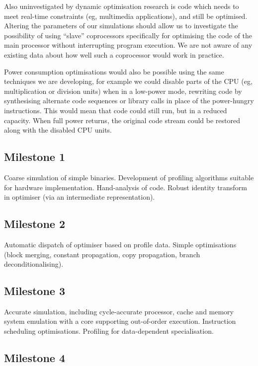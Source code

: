 \documentclass[11pt,letterpaper,onecolumn,notitlepage]{article}
\begin{document}
Also uninvestigated by dynamic optimisation research is code which needs to meet real-time constraints (eg, multimedia applications), and still be optimised. Altering the parameters of our simulations should allow us to investigate the possibility of using ``slave'' coprocessors specifically for optimising the code of the main processor without interrupting program execution. We are not aware of any existing data about how well such a coprocessor would work in practice.

Power consumption optimisations would also be possible using the same techniques we are developing, for example we could disable parts of the CPU (eg, multiplication or division units) when in a low-power mode, rewriting code by synthesising alternate code sequences or library calls in place of the power-hungry instructions. This would mean that code could still run, but in a reduced capacity. When full power returns, the original code stream could be restored along with the disabled CPU units.

\subsection{Milestone 1}

Coarse simulation of simple binaries. Development of profiling algorithms suitable for hardware implementation. Hand-analysis of code. Robust identity transform in optimiser (via an intermediate representation).

\subsection{Milestone 2}

Automatic dispatch of optimiser based on profile data. Simple optimisations (block merging, constant propagation, copy propagation, branch deconditionalising).

\subsection{Milestone 3}

Accurate simulation, including cycle-accurate processor, cache and memory system emulation with a core supporting out-of-order execution. Instruction scheduling optimisations. Profiling for data-dependent specialisation.

\subsection{Milestone 4}
\end{document}
